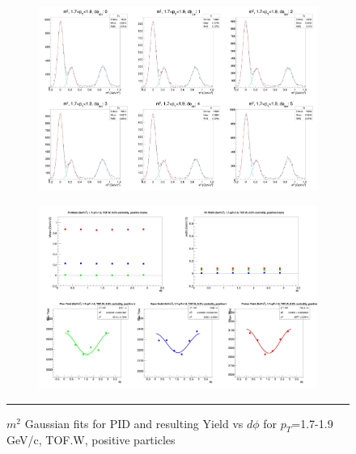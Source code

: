 \begin{figure}[H]
  \centering
    \begin{subfigure}[p]{1\textwidth}
    \includegraphics[width=1\textwidth]{lowptfits/yieldvsdphi_tof1_cent0_ch1_pT-17-19.jpg}
    \end{subfigure}
    \begin{subfigure}[p]{1\textwidth}
    \includegraphics[width=1\textwidth]{lowptfits/fitParams_tof1_cent0_ch1_pT-17-19.jpg}
    \end{subfigure}
    \rule{35em}{0.5pt}
  \caption[PID fits and Yield vs $d\phi$ for $p_T$=1.7-1.9 GeV/c, TOF.W, positive particles ]{$m^2$ Gaussian fits for PID and resulting Yield vs $d\phi$ for $p_T$=1.7-1.9 GeV/c, TOF.W, positive particles}
  \label{fig:fits17-19pos}
\end{figure}

